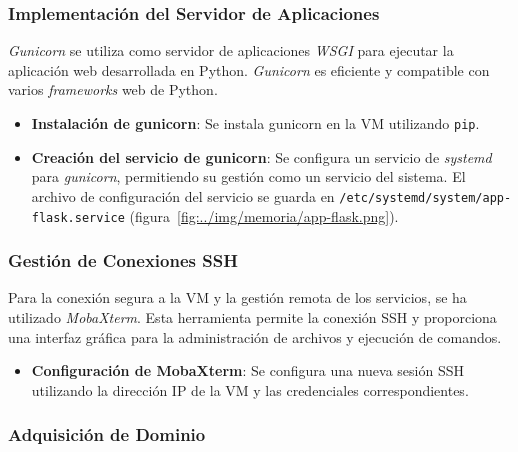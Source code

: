 
\subsubsection{Implementación del Servidor de Aplicaciones}

\textit{Gunicorn} se utiliza como servidor de aplicaciones \textit{WSGI} para ejecutar la aplicación web desarrollada en Python. \textit{Gunicorn} es eficiente y compatible con varios \textit{frameworks} web de Python.

\begin{itemize}
	\item \textbf{Instalación de gunicorn}: Se instala gunicorn en la VM utilizando \texttt{pip}.
	\item \textbf{Creación del servicio de gunicorn}: Se configura un servicio de \textit{systemd} para \textit{gunicorn}, permitiendo su gestión como un servicio del sistema. El archivo de configuración del servicio se guarda en \texttt{/etc/systemd/system/app-flask.service} (figura~\ref{fig:../img/memoria/app-flask.png}).
\end{itemize}


\subsubsection{Gestión de Conexiones SSH}

Para la conexión segura a la VM y la gestión remota de los servicios, se ha utilizado \textit{MobaXterm}. Esta herramienta permite la conexión SSH y proporciona una interfaz gráfica para la administración de archivos y ejecución de comandos.

\begin{itemize}
	\item \textbf{Configuración de MobaXterm}: Se configura una nueva sesión SSH utilizando la dirección IP de la VM y las credenciales correspondientes.
\end{itemize}

\subsubsection{Adquisición de Dominio}

